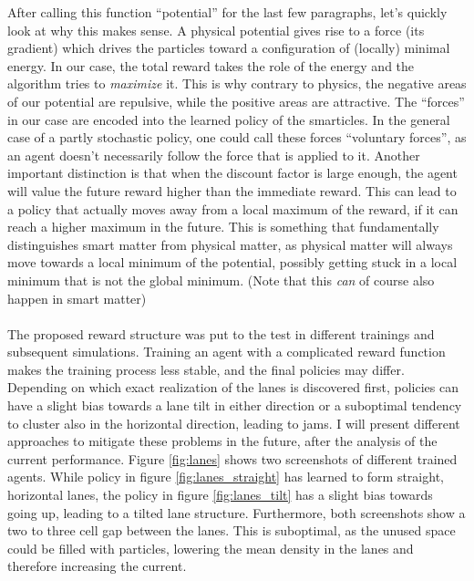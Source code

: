 After calling this function \enquote{potential} for the last few paragraphs, let's quickly look at why this makes sense. A physical potential gives rise to a force (its gradient) which drives the particles toward a configuration of (locally) minimal energy. In our case, the total reward takes the role of the energy and the algorithm tries to \textit{maximize} it. This is why contrary to physics, the negative areas of our potential are repulsive, while the positive areas are attractive. The \enquote{forces} in our case are encoded into the learned policy of the smarticles. In the general case of a partly stochastic policy, one could call these forces \enquote{voluntary forces}, as an agent doesn't necessarily follow the force that is applied to it. Another important distinction is that when the discount factor is large enough, the agent will value the future reward higher than the immediate reward. This can lead to a policy that actually moves away from a local maximum of the reward, if it can reach a higher maximum in the future. This is something that fundamentally distinguishes smart matter from physical matter, as physical matter will always move towards a local minimum of the potential, possibly getting stuck in a local minimum that is not the global minimum. (Note that this \textit{can} of course also happen in smart matter)
\\
\\
The proposed reward structure was put to the test in different trainings and subsequent simulations. Training an agent with a complicated reward function makes the training process less stable, and the final policies may differ. Depending on which exact realization of the lanes is discovered first, policies can have a slight bias towards a lane tilt in either direction or a suboptimal tendency to cluster also in the horizontal direction, leading to jams. I will present different approaches to mitigate these problems in the future, after the analysis of the current performance. Figure \ref{fig:lanes} shows two screenshots of different trained agents. While policy in figure \ref{fig:lanes_straight} has learned to form straight, horizontal lanes, the policy in figure \ref{fig:lanes_tilt} has a slight bias towards going up, leading to a tilted lane structure. Furthermore, both screenshots show a two to three cell gap between the lanes. This is suboptimal, as the unused space could be filled with particles, lowering the mean density in the lanes and therefore increasing the current. 

